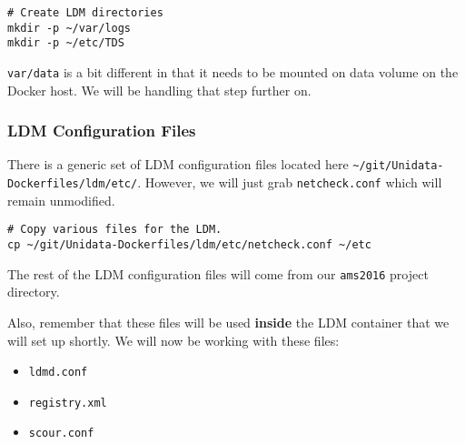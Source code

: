 \documentclass[11pt]{article}
\begin{document}
\begin{verbatim}
# Create LDM directories
mkdir -p ~/var/logs 
mkdir -p ~/etc/TDS
\end{verbatim}

\texttt{var/data} is a bit different in that it needs to be mounted on data volume on the Docker host. We will be handling that step further on.

\subsubsection{LDM Configuration Files}
\label{sec:orgheadline22}

There is a generic set of LDM configuration files located here \texttt{\textasciitilde{}/git/Unidata-Dockerfiles/ldm/etc/}. However, we will just grab \texttt{netcheck.conf} which will remain unmodified.

\begin{verbatim}
# Copy various files for the LDM.
cp ~/git/Unidata-Dockerfiles/ldm/etc/netcheck.conf ~/etc
\end{verbatim}

The rest of the LDM configuration files will come from our \texttt{ams2016} project directory.

Also, remember that these files will be used \textbf{inside} the LDM container that we will set up shortly. We will now be working with these files:

\begin{itemize}
\item \texttt{ldmd.conf}
\item \texttt{registry.xml}
\item \texttt{scour.conf}
\end{itemize}
\end{document}
